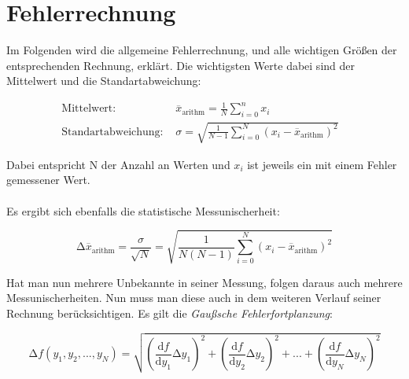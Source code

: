 \section{Fehlerrechnung}
\label{sec:Fehlerrechnung}

Im Folgenden wird die allgemeine Fehlerrechnung, und alle wichtigen Größen der entsprechenden Rechnung, erklärt.
Die wichtigsten Werte dabei sind der Mittelwert und die Standartabweichung:

\begin{align}
    \text{Mittelwert:} & \stackrel{_{-}}{x}_{\text{arithm}}  = \frac{1}{N} \sum_{i=0}^{n} x_i & \\
    \text{Standartabweichung: } & \sigma  = \sqrt{\frac{1}{N - 1 } \sum_{i=0}^{N} (x_i -  \stackrel{_{-}}{x}_{\text{arithm}})^2}
\end{align}

Dabei entspricht N der Anzahl an Werten und $x_i$ ist jeweils ein mit einem Fehler gemessener Wert.\\
\\
Es ergibt sich ebenfalls die statistische Messunischerheit:

\begin{equation}
    \increment \stackrel{_{-}}{x}_{\text{arithm}} = \frac{\sigma}{\sqrt{N}} = 
    \sqrt{\frac{1}{N(N - 1)} \sum_{i=0}^{N} (x_i -  \stackrel{_{-}}{x}_{\text{arithm}})^2}
\end{equation}

Hat man nun mehrere Unbekannte in seiner Messung, folgen daraus auch mehrere Messunischerheiten.
Nun muss man diese auch in dem weiteren Verlauf seiner Rechnung berücksichtigen.
Es gilt die \textit{Gaußsche Fehlerfortplanzung}:

\begin{equation}
    \increment f(y_1 ,y_2 ,...,y_N ) = \sqrt{\left(\frac{\text{d} f}{\text{d} y_{1}} \increment y_{1}\right)^2
    + \left(\frac{\text{d} f}{\text{d} y_{2}} \increment y_{2}\right)^2 + ... + 
    \left(\frac{\text{d} f}{\text{d} y_{N}} \increment y_{N}\right)^2
    }
\end{equation}